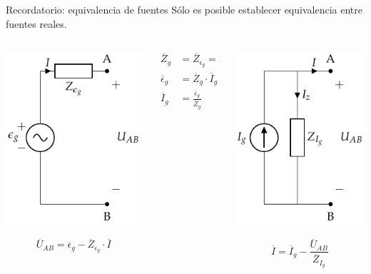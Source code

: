\documentclass[aspectratio=169, usenames,svgnames,dvipsnames]{beamer}
\begin{document}
\begin{frame}[label={sec:org3fd0a49}]{Recordatorio: equivalencia de fuentes}
Sólo es posible establecer equivalencia entre \alert{fuentes reales}.
\begin{columns}
\begin{column}{0.33\columnwidth}
\begin{center}
\includegraphics[height=0.5\textheight]{../figs/FuenteTensionReal.pdf}
\end{center}
\[
  \overline{U}_{AB} = \overline{\epsilon}_g - \overline{Z}_{\epsilon_g} \cdot \overline{I}
\]
\end{column}
\begin{column}{0.33\columnwidth}
\begin{align*}
  \overline{Z}_g &= \overline{Z}_{\epsilon_g} = \overline{Z}_{I_g}\\
  \overline{\epsilon}_g &= \overline{Z}_g \cdot \overline{I}_g\\
  \overline{I}_g &= \frac{\overline{\epsilon}_g}{\overline{Z}_g}
\end{align*}
\end{column}
\begin{column}{0.33\columnwidth}
\begin{center}
\includegraphics[height=0.5\textheight]{../figs/FuenteCorrienteReal.pdf}
\end{center}
\[
  \overline{I} = \overline{I}_g - \frac{\overline{U}_{AB}}{\overline{Z}_{I_g}}
\]
\end{column}
\end{columns}
\end{frame}
\end{document}
